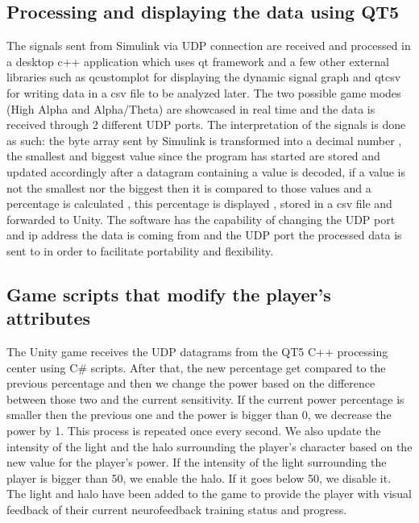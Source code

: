 \documentclass[runningheads]{llncs}
\begin{document}
\subsection{ Processing and displaying the data using QT5}
The signals sent from Simulink via UDP connection are received and processed in a desktop c++ application which uses qt framework and a few other external libraries such as qcustomplot for displaying the dynamic signal graph and qtcsv for writing data in a csv file to be analyzed later. The two possible game modes (High Alpha and Alpha/Theta) are showcased in real time and the data is received through 2 different UDP ports. The interpretation of the signals is done as such: the byte array sent by Simulink is transformed into a decimal number , the smallest and biggest value since the program has started are stored and updated accordingly after a datagram containing a value is decoded, if a value is not the smallest nor the biggest then it is compared to those values and a percentage is calculated , this percentage is displayed , stored in a csv file and forwarded to Unity. The software has the capability of changing the UDP port and ip address the data is coming from and the UDP port the processed data is sent to in order to facilitate portability and flexibility.
\subsection{ Game scripts that modify the player's attributes}
The Unity game receives the UDP datagrams from the QT5 C++ processing center using C\# scripts. After that, the new percentage get compared to the previous percentage and then we change the power based on the difference between those two and the current sensitivity. If the current power percentage is smaller then the previous one and the power is bigger than 0, we decrease the power by 1. This process is repeated once every second. We also update the intensity of the light and the halo surrounding the player's character based on the new value for the player's power. If the intensity of the light surrounding the player is bigger than 50, we enable the halo. If it goes below 50, we disable it. The light and halo have been added to the game to provide the player with visual feedback of their current neurofeedback training status and progress.
\end{document}
